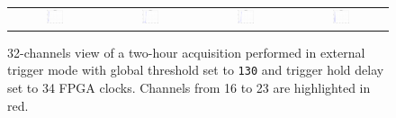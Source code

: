 \begin{figure}[hbt!]
\begin{tabular}{cccc}
        \includegraphics[width=0.204\textwidth]{Images/chap3/results/muons/ch_ext_trigger/incoming_energy_32channels_34_2hr_28.pdf} & \includegraphics[width=0.204\textwidth]{Images/chap3/results/muons/ch_ext_trigger/incoming_energy_32channels_34_2hr_29.pdf} & \includegraphics[width=0.204\textwidth]{Images/chap3/results/muons/ch_ext_trigger/incoming_energy_32channels_34_2hr_30.pdf} & \includegraphics[width=0.204\textwidth]{Images/chap3/results/muons/ch_ext_trigger/incoming_energy_32channels_34_2hr_31.pdf}\\
    \end{tabular}
    \caption{32-channels view of a two-hour acquisition performed in external trigger mode with global threshold set to \texttt{130} and trigger hold delay set to 34 FPGA clocks. Channels from 16 to 23 are highlighted in red.}
    \label{figMUON32channels}
\end{figure}